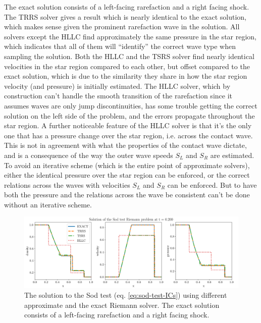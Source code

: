 The exact solution consists of a left-facing rarefaction and a right facing shock. The TRRS
solver gives a result which is nearly identical to the exact solution, which makes sense given the
prominent rarefaction wave in the solution. All solvers except the HLLC find approximately the
same pressure in the star region, which indicates that all of them will ``identify'' the correct
wave type when sampling the solution.
Both the HLLC and the TSRS solver find nearly identical velocities in the star region compared to
each other, but offset compared to the exact solution, which is due to the similarity they share in
how the star region velocity (and pressure) is initially estimated.
The HLLC solver, which by construction can't handle the
smooth transition of the rarefaction since it assumes waves are only jump discontinuities, has some
trouble getting the correct solution on the left side of the problem, and the errors propagate
throughout the star region. A further noticeable feature of the HLLC solver is that it's the only
one that has a pressure change over the star region, i.e. across the contact wave. This is not in
agreement with what the properties of the contact wave dictate, and is a consequence of the way the
outer wave speeds $S_L$ and $S_R$ are estimated. To avoid an iterative scheme (which is the
entire point of approximate solvers), either the identical pressure over the star region can be
enforced, or the correct relations across the waves with velocities $S_L$ and $S_R$ can be
enforced. But to have both the pressure and the relations across the wave be consistent can't be
done without an iterative scheme.



\begin{figure}
\centering
\includegraphics[width=\textwidth]{
./figures/FV/approximate_riemann_solvers/riemann-approximate-sod_test-0.200.png} %
\caption[Sod test solution with approximate Riemann solvers]{
    The solution to the Sod test (eq. \ref{eq:sod-test-ICs}) using different approximate and the
    exact Riemann solver. The exact solution consists of a left-facing rarefaction and a right
    facing shock.
    }%
\label{fig:approximate-riemann-sod-test}
\end{figure}




